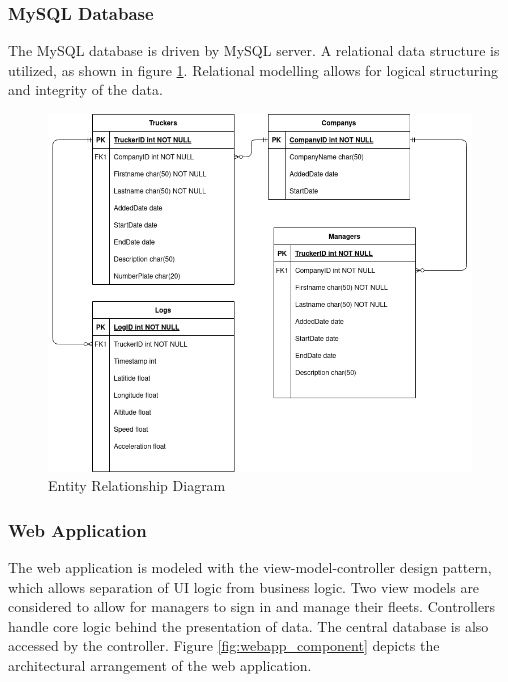 \subsubsection{MySQL Database}
The MySQL database is driven by MySQL server.
A relational data structure is utilized, as shown in figure \ref{fig:ERD_Overview}.
Relational modelling allows for logical structuring and integrity of the data.
\begin{figure}[H]
\centering
\includegraphics[width=6in]{ERD_Overview.png}
\caption{Entity Relationship Diagram}
\label{fig:ERD_Overview}
\end{figure}

\subsubsection{Web Application}
The web application is modeled with the view-model-controller design pattern, which allows separation of UI logic from business logic.
Two view models are considered to allow for managers to sign in and manage their fleets.
Controllers handle core logic behind the presentation of data.
The central database is also accessed by the controller.
Figure \ref{fig:webapp_component} depicts the architectural arrangement of the web application.

